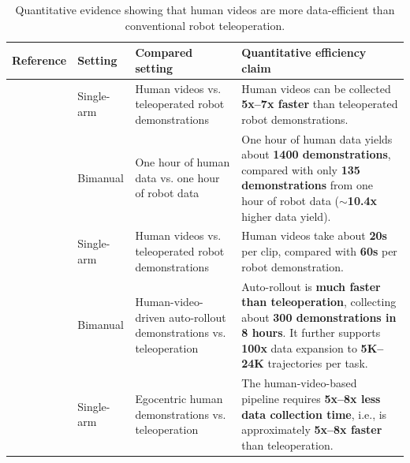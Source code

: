 \documentclass[Afour,sageh,times]{sagej}
\begin{document}
\begin{table}[t]
\centering
\scriptsize
\setlength{\tabcolsep}{4.2pt}
\caption{Quantitative evidence showing that human videos are more data-efficient than conventional robot teleoperation.}
\label{tab:human_video_efficiency}
\begin{tabularx}{\linewidth}{p{2.3cm}p{1.8cm}p{3.4cm} X}
\toprule
Reference & Setting & Compared setting & Quantitative efficiency claim \\
\midrule
\cite{jang2022bc} & Single-arm & Human videos vs. teleoperated robot demonstrations & Human videos can be collected \textbf{5x--7x faster} than teleoperated robot demonstrations. \\
\cite{kareer2025egomimic} & Bimanual & One hour of human data vs. one hour of robot data & One hour of human data yields about \textbf{1400 demonstrations}, compared with only \textbf{135 demonstrations} from one hour of robot data (\textbf{$\sim$10.4x} higher data yield). \\
\cite{dan2025x} & Single-arm & Human videos vs. teleoperated robot demonstrations & Human videos take about \textbf{20s} per clip, compared with \textbf{60s} per robot demonstration. \\
\cite{zhou2025you} & Bimanual & Human-video-driven auto-rollout demonstrations vs. teleoperation & Auto-rollout is \textbf{much faster than teleoperation}, collecting about \textbf{300 demonstrations in 8 hours}. It further supports \textbf{100x} data expansion to \textbf{5K--24K} trajectories per task. \\
\cite{freeman2026warped} & Single-arm & Egocentric human demonstrations vs. teleoperation & The human-video-based pipeline requires \textbf{5x--8x less data collection time}, i.e., is approximately \textbf{5x--8x faster} than teleoperation. \\
\bottomrule
\end{tabularx}
\end{table}
\end{document}
